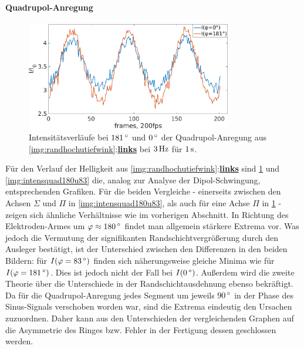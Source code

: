 \documentclass[numbers=noenddot,a4paper]{scrartcl}
\newcommand{\degree}{^\circ}
\newcommand{\fett}[1]{\textbf{#1}}
\begin{document}
				\paragraph{Quadrupol-Anregung}

						\begin{figure}[!t]
							\centering
							\includegraphics[width=0.8\textwidth,height=0.4\textwidth]{figs/auswertung/intens0u180quad3Hz1sek.png}
							\caption{Intensitätsverläufe bei $\unit[181]{\degree}$  und $\unit[0]{\degree}$ der Quadrupol-Anregung aus \ref{img:randhochutiefwink}:\underline{\fett{links}} bei $\unit[3]{Hz}$ für $\unit[1]{s}$. }
							\label{img:intensquad180u360}
						\end{figure}

					Für den Verlauf der Helligkeit aus \ref{img:randhochutiefwink}:\underline{\fett{links}} sind \ref{img:intensquad180u360} und \ref{img:intensquad180u83} die, analog zur Analyse der Dipol-Schwingung, entsprechenden Grafiken. Für die beiden Vergleiche - einerseits zwischen den Achsen $\Sigma$ und $\Pi$ in \ref{img:intensquad180u83}, als auch für eine Achse $\Pi$ in \ref{img:intensquad180u360} - zeigen sich ähnliche Verhältnisse wie im vorherigen Abschnitt. In Richtung des Elektroden-Armes um $\varphi\approx\unit[180]{\degree}$ findet man allgemein stärkere Extrema vor. Was jedoch die Vermutung der signifikanten Randschichtvergrößerung durch den Ausleger bestätigt, ist der Unterschied zwischen den Differenzen in den beiden Bildern: für $I(\varphi=\unit[83]{\degree})$ finden sich näherungsweise gleiche Minima wie für $I(\varphi=\unit[181]{\degree})$. Dies ist jedoch nicht der Fall bei $I(\unit[0]{\degree})$. Außerdem wird die zweite Theorie über die Unterschiede in der Randschichtausdehnung ebenso bekräftigt. Da für die Quadrupol-Anregung jedes Segment um jeweils $\unit[90]{\degree}$ in der Phase des Sinus-Signals verschoben worden war, sind die Extrema eindeutig den Ursachen zuzuordnen. Daher kann aus den Unterschieden der vergleichenden Graphen auf die Asymmetrie des Ringes bzw. Fehler in der Fertigung dessen geschlossen werden.
\end{document}
